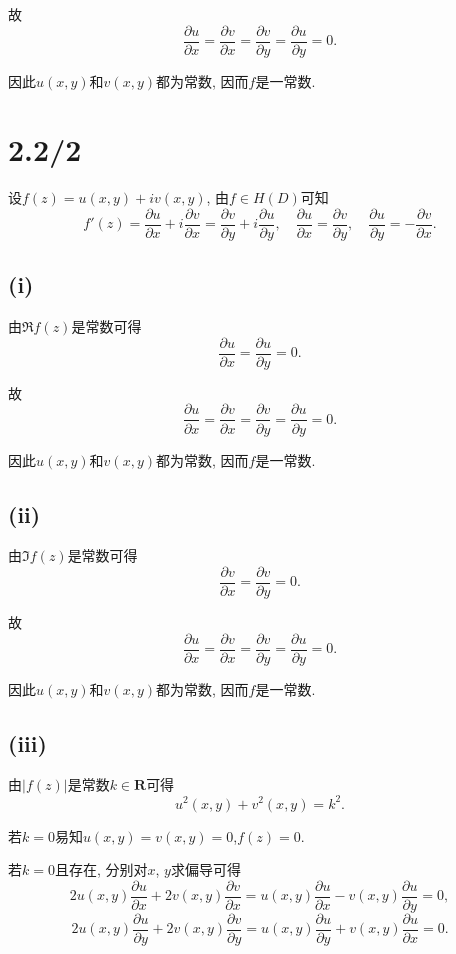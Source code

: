 \documentclass{article}
\begin{document}
故
$$\frac{\partial u}{\partial x}=\frac{\partial v}{\partial x}=\frac{\partial v}{\partial y}=\frac{\partial u}{\partial y}=0.$$

因此$u(x,y)$和$v(x,y)$都为常数, 因而$f$是一常数.

\section{2.2/2}

设$f(z)=u(x,y)+iv(x,y)$, 由$f\in H(D)$可知
$$f'(z)=\frac{\partial u}{\partial x}+i\frac{\partial v}{\partial x}=\frac{\partial v}{\partial y}+i\frac{\partial u}{\partial y},\quad\frac{\partial u}{\partial x}=\frac{\partial v}{\partial y},\quad\frac{\partial u}{\partial y}=-\frac{\partial v}{\partial x}.$$

\subsection*{(i)}

由$\Re f(z)$是常数可得
$$\frac{\partial u}{\partial x}=\frac{\partial u}{\partial y}=0.$$

故
$$\frac{\partial u}{\partial x}=\frac{\partial v}{\partial x}=\frac{\partial v}{\partial y}=\frac{\partial u}{\partial y}=0.$$

因此$u(x,y)$和$v(x,y)$都为常数, 因而$f$是一常数.

\subsection*{(ii)}

由$\Im f(z)$是常数可得
$$\frac{\partial v}{\partial x}=\frac{\partial v}{\partial y}=0.$$

故
$$\frac{\partial u}{\partial x}=\frac{\partial v}{\partial x}=\frac{\partial v}{\partial y}=\frac{\partial u}{\partial y}=0.$$

因此$u(x,y)$和$v(x,y)$都为常数, 因而$f$是一常数.

\subsection*{(iii)}

由$|f(z)|$是常数$k\in\mathbf{R}$可得
$$u^2(x,y)+v^2(x,y)=k^2.$$

若$k=0$易知$u(x,y)=v(x,y)=0$,$f(z)=0$.

若$k=0$且存在, 分别对$x$, $y$求偏导可得
$$2u(x,y)\frac{\partial u}{\partial x}+2v(x,y)\frac{\partial v}{\partial x}=u(x,y)\frac{\partial u}{\partial x}-v(x,y)\frac{\partial u}{\partial y}=0,$$
$$2u(x,y)\frac{\partial u}{\partial y}+2v(x,y)\frac{\partial v}{\partial y}=u(x,y)\frac{\partial u}{\partial y}+v(x,y)\frac{\partial u}{\partial x}=0.$$
\end{document}
